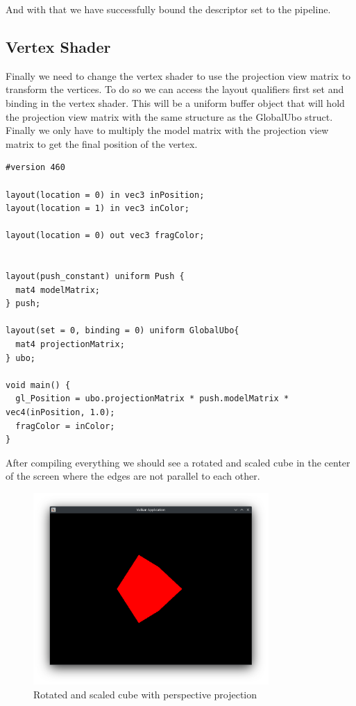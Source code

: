 \documentclass[12pt]{report} \usepackage{preamble}
\begin{document}
And with that we have successfully bound the descriptor set to the pipeline.

\subsection{Vertex Shader}

Finally we need to change the vertex shader to use the projection view matrix to transform the vertices.
To do so we can access the layout qualifiers first set and binding in the vertex shader.
This will be a uniform buffer object that will hold the projection view matrix with the same structure as the GlobalUbo struct.
Finally we only have to multiply the model matrix with the projection view matrix to get the final position of the vertex.

\begin{lstlisting}[Language=C++]
#version 460

layout(location = 0) in vec3 inPosition;
layout(location = 1) in vec3 inColor;

layout(location = 0) out vec3 fragColor;


layout(push_constant) uniform Push {
  mat4 modelMatrix;
} push;

layout(set = 0, binding = 0) uniform GlobalUbo{
  mat4 projectionMatrix;
} ubo;

void main() {
  gl_Position = ubo.projectionMatrix * push.modelMatrix * vec4(inPosition, 1.0);
  fragColor = inColor;
}
\end{lstlisting}

After compiling everything we should see a rotated and scaled cube in the center of the screen where the edges are not parallel to each other.

\begin{figure}[htbp]
	\centering
	\includegraphics[width=0.8\textwidth]{images/perspective_cube.png}
	\caption{Rotated and scaled cube with perspective projection}
\end{figure}
\end{document}
